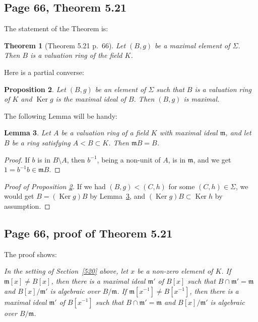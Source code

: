 \documentclass[parskip=half,fontsize=12pt]{scrartcl}%
\newcommand{\mf}{\mathfrak}
\newcommand{\mmm}{\mf m}
\newcommand{\Ker}{\operatorname{Ker}}\newcommand{\Coker}{\operatorname{Coker}}
\newtheorem{thm}{Theorem}%
\newtheorem{lem}[thm]{Lemma}
\newtheorem{prop}[thm]{Proposition}
\begin{document}
\subsection{Page 66, Theorem 5.21}%

The statement of the Theorem is:

\begin{thm}[Theorem 5.21 p.~66]
Let $(B,g)$ be a maximal element of $\Sigma$. Then $B$ is a valuation ring of the field $K$.
\end{thm}

Here is a partial converse:

\begin{prop}\label{521}
Let $(B,g)$ be an element of $\Sigma$ such that $B$ is a valuation ring of $K$ and $\Ker g$ is the maximal ideal of $B$. Then $(B,g)$ is maximal.
\end{prop}

The following Lemma will be handy:

\begin{lem}\label{vrok}
Let $A$ be a valuation ring of a field $K$ with maximal ideal $\mmm$, and let $B$ be a ring satisfying $A<B\subset K$. Then $\mmm B=B$.
\end{lem}

\begin{proof}
If $b$ is in $B\setminus A$, then $b^{-1}$, being a non-unit of $A$, is in $\mmm$, and we get $1=b^{-1}b\in\mmm B$.
\end{proof}

\begin{proof}[Proof of Proposition \ref{521}] 
If we had $(B,g)<(C,h)$ for some $(C,h)\in\Sigma$, we would get $B=(\Ker g)B$ by Lemma~\ref{vrok}, and $(\Ker g)B\subset\Ker h$ by assumption. %
\end{proof}

\subsection{Page 66, proof of Theorem 5.21}\label{521p}%

The proof shows:

\emph{In the setting of Section~\ref{520} above, let $x$ be a non-zero element of $K$. If $\mmm[x]\ne B[x]$, then there is a maximal ideal $\mmm'$ of $B[x]$ such that $B\cap\mmm'=\mmm$ %
and $B[x]/\mmm'$ is algebraic over $B/\mmm$. If $\mmm[x^{-1}]\ne B[x^{-1}]$, then there is a maximal ideal $\mmm'$ of $B[x^{-1}]$ such that $B\cap\mmm'=\mmm$ %
and $B[x]/\mmm'$ is algebraic over $B/\mmm$.}
\end{document}
